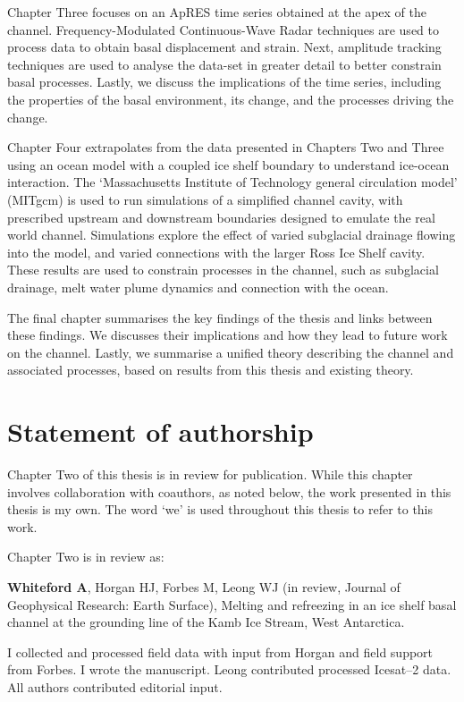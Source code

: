 
Chapter Three focuses on an ApRES time series obtained at the apex of the channel.  Frequency-Modulated Continuous-Wave Radar techniques are used to process data to obtain basal displacement and strain.  Next, amplitude tracking techniques are used to analyse the data-set in greater detail to better constrain basal processes. Lastly, we discuss the implications of the time series, including the properties of the basal environment, its change, and the processes driving the change.


Chapter Four extrapolates from the data presented in Chapters Two and Three using an ocean model with a coupled ice shelf boundary to understand ice-ocean interaction. The `Massachusetts Institute of Technology general circulation model' (MITgcm) is used to run simulations of a simplified channel cavity, with prescribed upstream and downstream boundaries designed to emulate the real world channel. Simulations explore the effect of varied subglacial drainage flowing into the model, and varied connections with the larger Ross Ice Shelf cavity. These results are  used to constrain processes in the channel, such as subglacial drainage, melt water plume dynamics and connection with the ocean.

The final chapter summarises the key findings of the thesis and links between these findings. We discusses their implications and how they lead to future work on the channel. Lastly, we  summarise a unified theory describing the channel and associated processes, based on results from this thesis and existing theory.

\section{Statement of authorship}
Chapter Two of this thesis is in review for publication. While this chapter involves collaboration with coauthors, as noted below, the work presented in this thesis is my own. The word `we' is used throughout this thesis to refer to this work. 

Chapter Two is in review as:

\textbf{Whiteford A}, Horgan HJ, Forbes M, Leong WJ (in review, Journal of Geophysical Research: Earth Surface), Melting and refreezing in an ice shelf basal channel at the grounding line of the Kamb Ice Stream, West Antarctica. 

I collected and processed field data with input from Horgan and field support from Forbes. I wrote the manuscript. Leong contributed processed Icesat--2 data. All authors contributed editorial input. 



